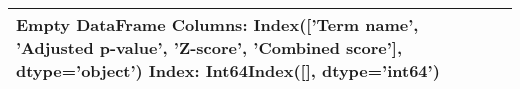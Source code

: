 \begin{tabular}{lrrr}
\toprule
Empty DataFrame
Columns: Index(['Term name', 'Adjusted p-value', 'Z-score', 'Combined score'], dtype='object')
Index: Int64Index([], dtype='int64') \\
\bottomrule
\end{tabular}

